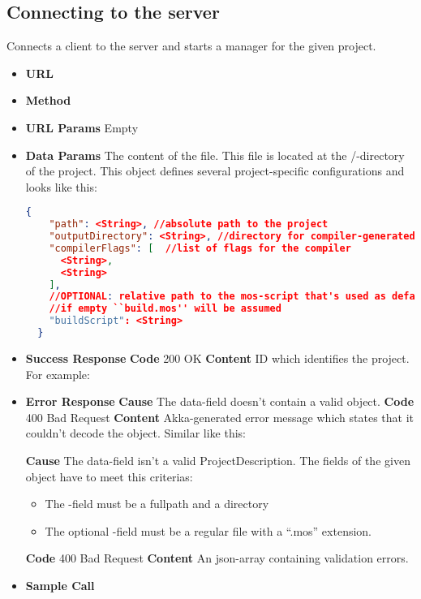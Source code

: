 \subsection{Connecting to the server}
Connects a client to the server and starts a manager for the given project.



\begin{itemize}
\item \textbf{URL} 
\item \textbf{Method} 
\item \textbf{URL Params} Empty
\item \textbf{Data Params}
  The content of the  file. This file is located at the /-directory of the project.
  This object defines several project-specific configurations and looks like this:
  \begin{lstlisting}[basicstyle=\small,language=json]
  {
    "path": <String>, //absolute path to the project
    "outputDirectory": <String>, //directory for compiler-generated files
    "compilerFlags": [  //list of flags for the compiler
      <String>,
      <String>
    ],
    //OPTIONAL: relative path to the mos-script that's used as default-script
    //if empty ``build.mos'' will be assumed
    "buildScript": <String>
  }
  \end{lstlisting}
\item \textbf{Success Response}
  \newline\textbf{Code} 200 OK
  \newline\textbf{Content} ID which identifies the project. For example: 
\item \textbf{Error Response}
  \newline\textbf{Cause} The data-field doesn't contain a valid object.
  \newline\textbf{Code} 400 Bad Request
  \newline\textbf{Content} Akka-generated error message which states that it couldn't decode the
  object. Similar like this: 

  \textbf{Cause} The data-field isn't a valid ProjectDescription.
  The fields of the given object have to meet this criterias:
  \begin{itemize}
  \item The -field must be a fullpath and a directory
  \item The optional -field must be a regular file with a ``.mos'' extension.
  \end{itemize}
  \textbf{Code} 400 Bad Request
  \newline\textbf{Content} An json-array containing validation errors.
  \item \textbf{Sample Call}
\end{itemize}
